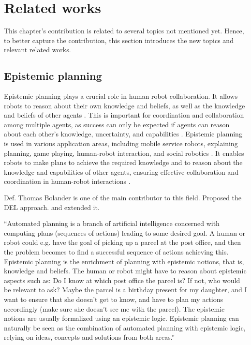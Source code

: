 \section{Related works}

    This chapter's contribution is related to several topics not mentioned yet. Hence, to better capture the contribution, this section introduces the new topics and relevant related works.  

    \subsection{Epistemic planning}
    Epistemic planning plays a crucial role in human-robot collaboration. It allows robots to reason about their own knowledge and beliefs, as well as the knowledge and beliefs of other agents \cite{bramblett_epistemic_2023}. This is important for coordination and collaboration among multiple agents, as success can only be expected if agents can reason about each other's knowledge, uncertainty, and capabilities \cite{bramblett_epistemic_prediction_2023}. Epistemic planning is used in various application areas, including mobile service robots, explaining planning, game playing, human-robot interaction, and social robotics \cite{hu_planning_2023}. It enables robots to make plans to achieve the required knowledge and to reason about the knowledge and capabilities of other agents, ensuring effective collaboration and coordination in human-robot interactions \cite{belle_epistemic_2023}.


    Def. Thomas Bolander is one of the main contributor to this field. Proposed the DEL approach. \cite{bolander_gentle_2017} and extended it.

    ``Automated planning is a branch of artificial intelligence concerned with computing plans (sequences of actions) leading to some desired goal. A human or robot could e.g. have the goal of picking up a parcel at the post office, and then the problem becomes to find a successful sequence of actions achieving this. Epistemic planning is the enrichment of planning with epistemic notions, that is, knowledge and beliefs. The human or robot might have to reason about epistemic aspects such as: Do I know at which post office the parcel is? If not, who would be relevant to ask? Maybe the parcel is a birthday present for my daughter, and I want to ensure that she doesn't get to know, and have to plan my actions accordingly (make sure she doesn't see me with the parcel). The epistemic notions are usually formalized using an epistemic logic. Epistemic planning can naturally be seen as the combination of automated planning with epistemic logic, relying on ideas, concepts and solutions from both areas.''

